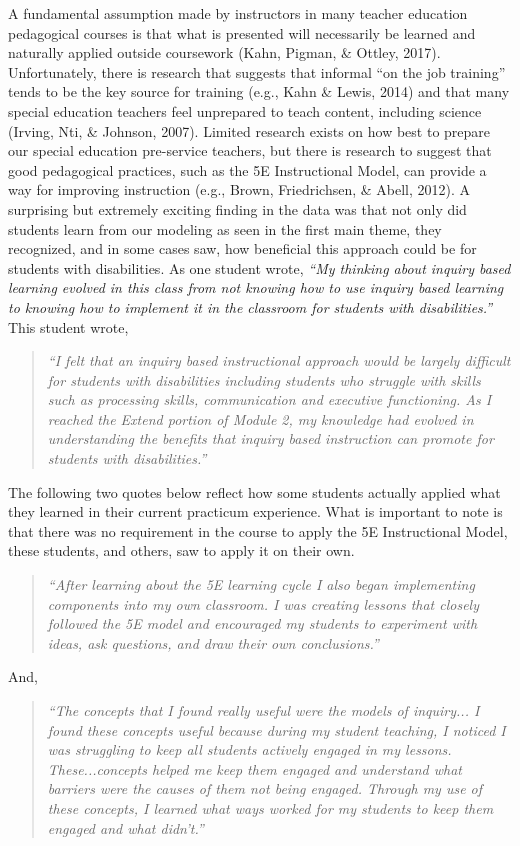 \documentclass[11.5pt]{sig-alternate} %
\begin{document}
\begin{large}
A fundamental assumption made by instructors in many teacher education pedagogical courses is that what is presented will necessarily be learned and naturally applied outside coursework (Kahn, Pigman, \& Ottley, 2017). Unfortunately, there is research that suggests that informal “on the job training” tends to be the key source for training (e.g., Kahn \& Lewis, 2014) and that many special education teachers feel unprepared to teach content, including science (Irving, Nti, \& Johnson, 2007). Limited research exists on how best to prepare our special education pre-service teachers, but there is research to suggest that good pedagogical practices, such as the 5E Instructional Model, can provide a way for improving instruction (e.g., Brown, Friedrichsen, \& Abell, 2012). A surprising but extremely exciting finding in the data was that not only did students learn from our modeling as seen in the first main theme, they recognized, and in some cases saw, how beneficial this approach could be for students with disabilities. As one student wrote, \textit{“My thinking about inquiry based learning evolved in this class from not knowing how to use inquiry based learning to knowing how to implement it in the classroom for students with disabilities.”} This student wrote,

\begin{quote}
    \textit{“I felt that an inquiry based instructional approach would be largely difficult for students with disabilities including students who struggle with skills such as processing skills, communication and executive functioning. As I reached the Extend portion of Module 2, my knowledge had evolved in understanding the benefits that inquiry based instruction can promote for students with disabilities.”}
\end{quote}

The following two quotes below reflect how some students actually applied what they learned in their current practicum experience. What is important to note is that there was no requirement in the course to apply the 5E Instructional Model, these students, and others, saw to apply it on their own. 

\begin{quote}
    \textit{“After learning about the 5E learning cycle I also began implementing components into my own classroom. I was creating lessons that closely followed the 5E model and encouraged my students to experiment with ideas, ask questions, and draw their own conclusions.”}
\end{quote}
And,
\begin{quote}
    \textit{“The concepts that I found really useful were the models of inquiry... I found these concepts useful because during my student teaching, I noticed I was struggling to keep all students actively engaged in my lessons. These...concepts helped me keep them engaged and understand what barriers were the causes of them not being engaged. Through my use of these concepts, I learned what ways worked for my students to keep them engaged and what didn’t.”}
\end{quote}


\end{large}
\end{document}
